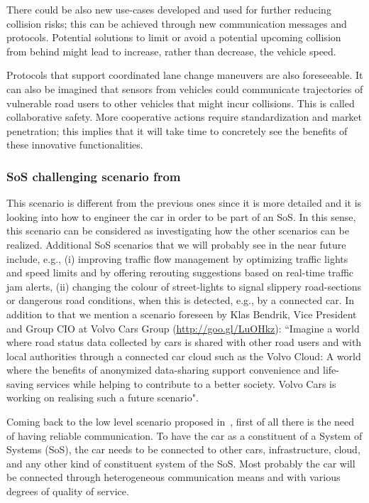 There could be also new use-cases developed and used for further reducing collision risks; this can be achieved through new communication messages and protocols. 
Potential solutions to limit or avoid a potential upcoming collision from behind might lead to
increase, rather than decrease, the vehicle speed.

Protocols that support coordinated lane change maneuvers are also foreseeable. It can also be imagined that sensors from vehicles could communicate trajectories of vulnerable road users to other vehicles 
that might incur collisions.
This is called collaborative safety. More cooperative actions require %
standardization and market penetration; this implies that it will take time to concretely see the benefits of these innovative functionalities. %



\subsubsection{SoS challenging scenario from~\cite{JSA2017}}

This scenario is different from the previous ones since it is more detailed and it is looking into how to engineer the car in order to be part of an SoS. In this sense, this scenario can be considered as investigating how the other scenarios can be realized. Additional SoS scenarios that we will probably see in the near future include, e.g., (i) improving traffic flow management by optimizing traffic lights and speed limits and by offering rerouting
suggestions based on real-time traffic jam alerts, (ii) changing the colour of street-lights to signal slippery
road-sections or dangerous road conditions, when this is detected, e.g., by a connected car.
In addition to that we mention a scenario foreseen by Klas Bendrik, Vice President and Group CIO at Volvo Cars Group ({\footnotesize \url{http://goo.gl/LuOHkz}}): ``Imagine a world where road status data collected
by cars is shared with other road users and with local authorities through a connected car cloud such as the
Volvo Cloud: A world where the benefits of anonymized data-sharing support convenience and life-saving services
while helping to contribute to a better society. Volvo Cars is working on realising such a future scenario". 


Coming back to the low level scenario proposed in~\cite{JSA2017}, first of all there is the need of having reliable communication. To have the car as a constituent of a System of Systems (SoS), the car needs to be connected to other cars, infrastructure, cloud, and any other kind of constituent system of the SoS. Most probably the car will be connected through heterogeneous communication means and with various degrees of quality of service.

